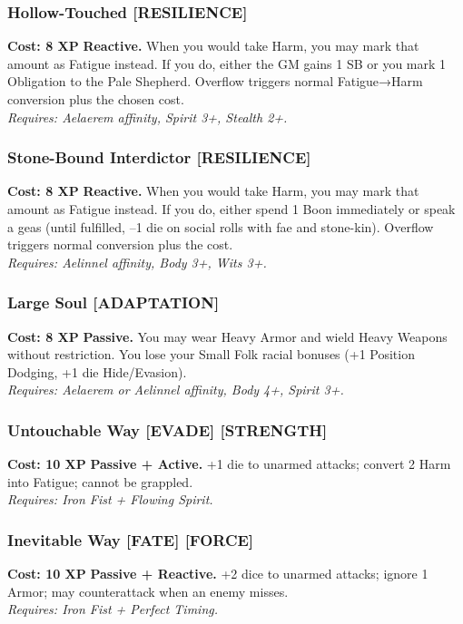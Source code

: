 \subsubsection*{Hollow-Touched \textnormal{[RESILIENCE]}}
\label{talent:hollow-touched}
\textbf{Cost: 8 XP} \textbf{Reactive.} When you would take Harm, you may mark that amount as Fatigue instead. If you do, either the GM gains 1 SB or you mark 1 Obligation to the Pale Shepherd. Overflow triggers normal Fatigue→Harm conversion plus the chosen cost. \\
\textit{Requires: Aelaerem affinity, Spirit 3+, Stealth 2+.}

\subsubsection*{Stone-Bound Interdictor \textnormal{[RESILIENCE]}}
\label{talent:stone-bound-interdictor}
\textbf{Cost: 8 XP} \textbf{Reactive.} When you would take Harm, you may mark that amount as Fatigue instead. If you do, either spend 1 Boon immediately or speak a geas (until fulfilled, –1 die on social rolls with fae and stone-kin). Overflow triggers normal conversion plus the cost. \\
\textit{Requires: Aelinnel affinity, Body 3+, Wits 3+.}

\subsubsection*{Large Soul \textnormal{[ADAPTATION]}}
\label{talent:large-soul}
\textbf{Cost: 8 XP} \textbf{Passive.} You may wear Heavy Armor and wield Heavy Weapons without restriction. You lose your Small Folk racial bonuses (+1 Position Dodging, +1 die Hide/Evasion). \\
\textit{Requires: Aelaerem or Aelinnel affinity, Body 4+, Spirit 3+.}

\subsubsection*{Untouchable Way \textnormal{[EVADE] [STRENGTH]}}
\label{talent:untouchable-way}
\textbf{Cost: 10 XP} \textbf{Passive + Active.} +1 die to unarmed attacks; convert 2 Harm into Fatigue; cannot be grappled. \\
\textit{Requires: Iron Fist + Flowing Spirit.}

\subsubsection*{Inevitable Way \textnormal{[FATE] [FORCE]}}
\label{talent:inevitable-way}
\textbf{Cost: 10 XP} \textbf{Passive + Reactive.} +2 dice to unarmed attacks; ignore 1 Armor; may counterattack when an enemy misses. \\
\textit{Requires: Iron Fist + Perfect Timing.}

